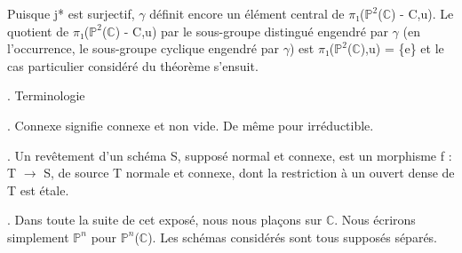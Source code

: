 \documentclass[10pt,a4paper]{article}
\begin{document}
\begin{adjustbox}{max totalsize={\textwidth}{0.945\textheight},center}
\begin{minipage}{\textwidth}
\noindent Puisque j* est surjectif, \ensuremath{γ} définit encore un élément central de \ensuremath{π₁}(\ensuremath{ℙ^2}(\ensuremath{ℂ}) - C,u). Le quotient de \ensuremath{π₁}(\ensuremath{ℙ^2}(\ensuremath{ℂ}) - C,u) par le sous-groupe distingué engendré par \ensuremath{γ} (en l'occurrence, le sous-groupe cyclique engendré par \ensuremath{γ}) est \ensuremath{π₁}(\ensuremath{ℙ^2}(\ensuremath{ℂ}),u) = \{e\} et le cas particulier considéré du théorème s'ensuit.\par\smallskip
{}. Terminologie\par\smallskip
{}. Connexe signifie connexe et non vide. De même pour irréductible.\par\smallskip
{}. Un revêtement d'un schéma S, supposé normal et connexe, est un morphisme f : T \ensuremath{→} S, de source T normale et connexe, dont la restriction à un ouvert dense de T est étale.\par\smallskip
{}. Dans toute la suite de cet exposé, nous nous plaçons sur \ensuremath{ℂ}. Nous écrirons simplement \ensuremath{ℙ^n} pour \ensuremath{ℙ^n}(\ensuremath{ℂ}). Les schémas considérés sont tous supposés séparés.\par\smallskip
\end{minipage}
\end{adjustbox}
\newpage
\end{document}
